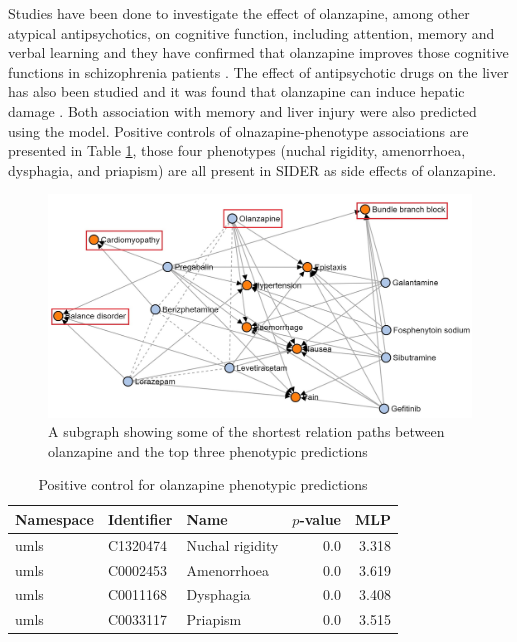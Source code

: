 Studies have been done to investigate the effect of olanzapine, among other atypical antipsychotics, on cognitive function, including attention, memory and verbal learning and they have confirmed that olanzapine improves those cognitive functions in schizophrenia patients \cite{mcgurk_cognitive_2004, smith_effects_2001, cuesta_effects_2001, purdon_neuropsychological_2000, bilder_neurocognitive_2002}. The effect of antipsychotic drugs on the liver has also been studied and it was found that olanzapine can induce hepatic damage \cite{lv_antipsychotic_2018}. Both association with memory and liver injury were also predicted using the model. Positive controls of olnazapine-phenotype associations are presented in Table \ref{tab:ps_olanzapine}, those four phenotypes (nuchal rigidity, amenorrhoea, dysphagia, and priapism) are all present in \ac{SIDER} as side effects of olanzapine.

\begin{figure}[h!]
    \centering
    \includegraphics[scale=0.6]
    {figures/olanzapine_phenotypes.jpg}
    \caption[Olanzapine-phentypes path subgraph]{\label{fig:olanzapine_phenotypes} A subgraph showing some of the shortest relation paths between olanzapine and the top three phenotypic predictions}
\end{figure}

\begin{table}
    \centering
    \begin{tabular}{|l|l|l|r|r|}
        \hline
        \textbf{Namespace} & \textbf{Identifier} & \textbf{Name} & \textbf{$p$-value} & \textbf{MLP} \\
        \hline
        umls & C1320474 & Nuchal rigidity &  0.0 & 3.318 \\
        \hline
        umls & C0002453 &  Amenorrhoea &  0.0 & 3.619 \\
        \hline
        umls & C0011168 &  Dysphagia &  0.0 & 3.408 \\
        \hline
        umls &  C0033117 & Priapism &  0.0 &  3.515 \\
        \hline
    \end{tabular}
    \caption{Positive control for olanzapine phenotypic predictions}
    \label{tab:ps_olanzapine}
\end{table}


